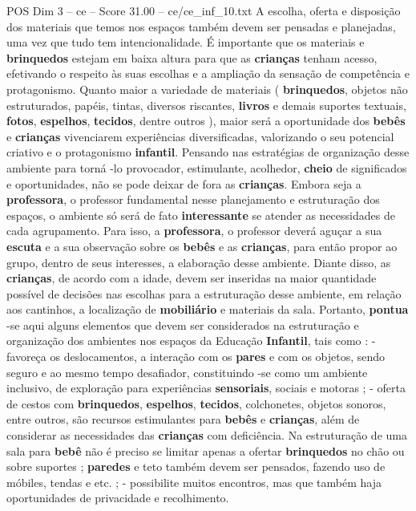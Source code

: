 \begin{textsample}{POS Dim 3 – ce – Score 31.00 – ce/ce\_inf\_10.txt}
A escolha, oferta e disposição dos materiais que temos nos espaços também devem ser pensadas e planejadas, uma vez que tudo tem intencionalidade.
É importante que os materiais e \textbf{brinquedos} estejam em baixa altura para que as \textbf{crianças} tenham acesso, efetivando o respeito às suas escolhas e a ampliação da sensação de competência e protagonismo.
Quanto maior a variedade de materiais ( \textbf{brinquedos}, objetos não estruturados, papéis, tintas, diversos riscantes, \textbf{livros} e demais suportes textuais, \textbf{fotos}, \textbf{espelhos}, \textbf{tecidos}, dentre outros ), maior será a oportunidade dos \textbf{bebês} e \textbf{crianças} vivenciarem experiências diversificadas, valorizando o seu potencial criativo e o protagonismo \textbf{infantil}.
Pensando nas estratégias de organização desse ambiente para torná -lo provocador, estimulante, acolhedor, \textbf{cheio} de significados e oportunidades, não se pode deixar de fora as \textbf{crianças}.
Embora seja a \textbf{professora}, o professor fundamental nesse planejamento e estruturação dos espaços, o ambiente só será de fato \textbf{interessante} se atender as necessidades de cada agrupamento.
Para isso, a \textbf{professora}, o professor deverá aguçar a sua \textbf{escuta} e a sua observação sobre os \textbf{bebês} e as \textbf{crianças}, para então propor ao grupo, dentro de seus interesses, a elaboração desse ambiente.
Diante disso, as \textbf{crianças}, de acordo com a idade, devem ser inseridas na maior quantidade possível de decisões nas escolhas para a estruturação desse ambiente, em relação aos cantinhos, a localização de \textbf{mobiliário} e materiais da sala.
Portanto, \textbf{pontua} -se aqui alguns elementos que devem ser considerados na estruturação e organização dos ambientes nos espaços da Educação \textbf{Infantil}, tais como : - favoreça os deslocamentos, a interação com os \textbf{pares} e com os objetos, sendo seguro e ao mesmo tempo desafiador, constituindo -se como um ambiente inclusivo, de exploração para experiências \textbf{sensoriais}, sociais e motoras ; - oferta de cestos com \textbf{brinquedos}, \textbf{espelhos}, \textbf{tecidos}, colchonetes, objetos sonoros, entre outros, são recursos estimulantes para \textbf{bebês} e \textbf{crianças}, além de considerar as necessidades das \textbf{crianças} com deficiência.
Na estruturação de uma sala para \textbf{bebê} não é preciso se limitar apenas a ofertar \textbf{brinquedos} no chão ou sobre suportes ; \textbf{paredes} e teto também devem ser pensados, fazendo uso de móbiles, tendas e etc. ; - possibilite muitos encontros, mas que também haja oportunidades de privacidade e recolhimento.

\end{textsample}
